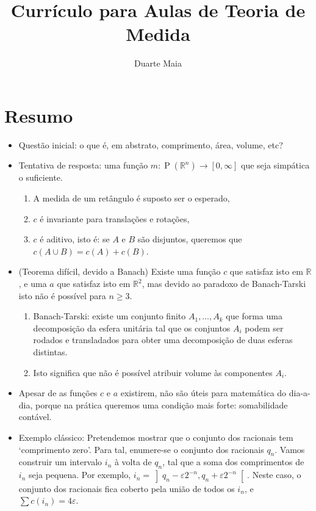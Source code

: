 \documentclass{article}
\title{Currículo para Aulas de Teoria de Medida}
\author{Duarte Maia}
\date{}
\newcommand{\R}{\mathbb{R}}
\DeclareMathOperator{\ps}{P}
\begin{document}
\maketitle

\section{Resumo}

\begin{itemize}
\item Questão inicial: o que é, em abstrato, comprimento, área, volume, etc?
\item Tentativa de resposta: uma função $m : \ps(\R^n) \to \left[0, \infty\right]$ que seja simpática o suficiente.
\begin{enumerate}
\item A medida de um retângulo é suposto ser o esperado,
\item $c$ é invariante para translações e rotações,
\item $c$ é aditivo, isto é: se $A$ e $B$ são disjuntos, queremos que $c(A \cup B) = c(A) + c(B)$.
\end{enumerate}
\item (Teorema difícil, devido a Banach) Existe uma função $c$ que satisfaz isto em $\R$, e uma $a$ que satisfaz isto em $\R^2$, mas devido ao paradoxo de Banach-Tarski isto não é possível para $n \geq 3$.
\begin{enumerate}
\item Banach-Tarski: existe um conjunto finito $A_1, \dots, A_k$ que forma uma decomposição da esfera unitária tal que os conjuntos $A_i$ podem ser rodados e transladados para obter uma decomposição de duas esferas distintas.
\item Isto significa que não é possível atribuir volume às componentes $A_i$.
\end{enumerate}
\item Apesar de as funções $c$ e $a$ existirem, não são úteis para matemática do dia-a-dia, porque na prática queremos uma condição mais forte: somabilidade contável.
\item Exemplo clássico: Pretendemos mostrar que o conjunto dos racionais tem `comprimento zero'. Para tal, enumere-se o conjunto dos racionais $q_n$. Vamos construir um intervalo $i_n$ à volta de $q_n$, tal que a soma dos comprimentos de $i_n$ seja pequena. Por exemplo, $i_n = \left]q_n - \varepsilon 2^{-n}, q_n + \varepsilon 2^{-n}\right[$. Neste caso, o conjunto dos racionais fica coberto pela união de todos os $i_n$, e $\sum c(i_n) = 4 \varepsilon$.

\end{itemize}
\end{document}
